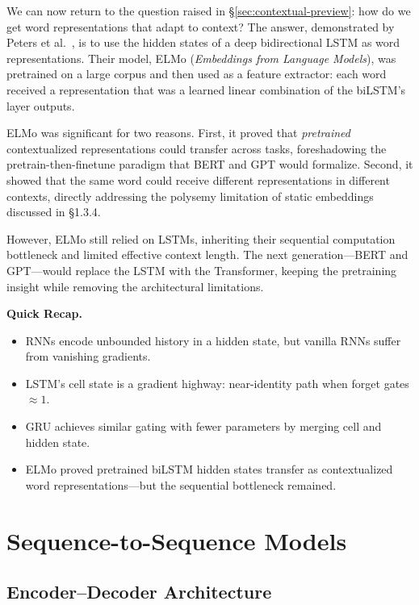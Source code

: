 We can now return to the question raised in \S\ref{sec:contextual-preview}: how do we get word representations that adapt to context? The answer, demonstrated by Peters et al.~\cite{peters2018elmo}, is to use the hidden states of a deep bidirectional LSTM as word representations. Their model, ELMo (\emph{Embeddings from Language Models}), was pretrained on a large corpus and then used as a feature extractor: each word received a representation that was a learned linear combination of the biLSTM's layer outputs.

ELMo was significant for two reasons. First, it proved that \emph{pretrained} contextualized representations could transfer across tasks, foreshadowing the pretrain-then-finetune paradigm that BERT and GPT would formalize. Second, it showed that the same word could receive different representations in different contexts, directly addressing the polysemy limitation of static embeddings discussed in \S1.3.4.

However, ELMo still relied on LSTMs, inheriting their sequential computation bottleneck and limited effective context length. The next generation---BERT and GPT---would replace the LSTM with the Transformer, keeping the pretraining insight while removing the architectural limitations.

\begin{quickrecap}
\textbf{Quick Recap.}
\begin{itemize}[nosep,leftmargin=1.5em]
  \item RNNs encode unbounded history in a hidden state, but vanilla RNNs suffer from vanishing gradients.
  \item LSTM's cell state is a gradient highway: near-identity path when forget gates $\approx 1$.
  \item GRU achieves similar gating with fewer parameters by merging cell and hidden state.
  \item ELMo proved pretrained biLSTM hidden states transfer as contextualized word representations---but the sequential bottleneck remained.
\end{itemize}
\end{quickrecap}

\section{Sequence-to-Sequence Models}

\subsection{Encoder--Decoder Architecture}


